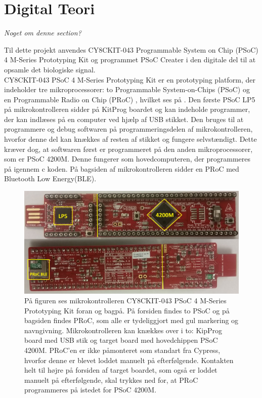 \section{Digital Teori}
\textit{Noget om denne section?}

Til dette projekt anvendes CY8CKIT-043 Programmable System on Chip (PSoC) 4 M-Series Prototyping Kit og programmet PSoC Creater i den digitale del til at opsamle det biologiske signal.\\
CY8CKIT-043 PSoC 4 M-Series Prototyping Kit er en prototyping platform, der indeholder tre mikroprocessorer: to Programmable System-on-Chips (PSoC) og en Programmable Radio on Chip (PRoC)%
, hvilket ses på . Den første PSoC LP5 på mikrokontrolleren sidder på KitProg boardet og kan indeholde programmer, der kan indlæses på en computer ved hjælp af USB stikket. Den bruges til at programmere og debug softwaren på programmeringsdelen af mikrokontrolleren, hvorfor denne del kan knækkes af resten af stikket og fungere selvstændigt. Dette kræver dog, at softwaren først er programmeret på den anden mikroprocessorer, som er PSoC 4200M. Denne fungerer som hovedcomputeren, der programmeres på igennem c koden. På bagsiden af mikrokontrolleren sidder en PRoC med Bluetooth Low Energy(BLE). \citep{CYPRESS2016PSoC,Semiconductor2016}
\begin{figure}[H]
	\centering
	\includegraphics[scale=0.15]{figures/bProblemloesning/PSoC3.jpg}
	\caption{På figuren ses mikrokontrolleren CY8CKIT-043 PSoC 4 M-Series Prototyping Kit foran og bagpå. På forsiden findes to PSoC og på bagsiden findes PRoC, som alle er tydeliggjort med gul markering og navngivning. Mikrokontrolleren kan knækkes over i to: KipProg board med USB stik og target board med hovedchippen PSoC 4200M. PRoC'en er ikke påmonteret som standart fra Cypress, hvorfor denne er blevet loddet manuelt på efterfølgende. Kontakten helt til højre på forsiden af target boardet, som også er loddet manuelt på efterfølgende, skal trykkes ned for, at PRoC programmeres på istedet for PSoC 4200M. \citep{CYPRESS2016PSoC,Semiconductor2016}}
	\label{fig:PSoC}
\end{figure}
